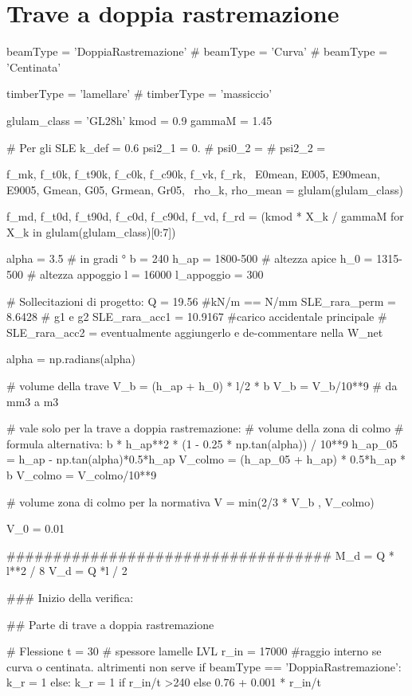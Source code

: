 \section{Trave a doppia rastremazione}
\begin{pycode}[TraveDoppiaRastremazione]
beamType = 'DoppiaRastremazione'
# beamType = 'Curva'
# beamType = 'Centinata'

timberType = 'lamellare'
# timberType = 'massiccio'

glulam_class = 'GL28h'
kmod = 0.9
gammaM = 1.45

# Per gli SLE
k_def = 0.6
psi2_1 = 0.
# psi0_2 =
# psi2_2 =

f_mk, f_t0k, f_t90k, f_c0k, f_c90k, f_vk, f_rk, \
E0mean, E005, E90mean, E9005, Gmean, G05, Grmean, Gr05, \
rho_k, rho_mean = glulam(glulam_class)

f_md, f_t0d, f_t90d, f_c0d, f_c90d, f_vd, f_rd = (kmod * X_k / gammaM for X_k in glulam(glulam_class)[0:7])

alpha = 3.5 # in gradi °
b = 240
h_ap = 1800-500 # altezza apice
h_0 = 1315-500 # altezza appoggio
l = 16000 
l_appoggio = 300

# Sollecitazioni di progetto:
Q = 19.56 #kN/m == N/mm
SLE_rara_perm = 8.6428 # g1 e g2
SLE_rara_acc1 = 10.9167 #carico accidentale principale
# SLE_rara_acc2 =  eventualmente aggiungerlo e de-commentare nella W_net

alpha = np.radians(alpha)

# volume della trave 
V_b = (h_ap + h_0) * l/2 * b 
V_b = V_b/10**9 # da mm3 a m3

# vale solo per la trave a doppia rastremazione:
# volume della zona di colmo
# formula alternativa: b * h_ap**2 * (1 - 0.25 * np.tan(alpha)) / 10**9
h_ap_05 = h_ap - np.tan(alpha)*0.5*h_ap
V_colmo =  (h_ap_05 + h_ap) * 0.5*h_ap * b
V_colmo = V_colmo/10**9

# volume zona di colmo per la normativa
V = min(2/3 * V_b , V_colmo)

V_0 = 0.01


###################################
M_d = Q * l**2 / 8
V_d = Q *l / 2

### Inizio della verifica:

## Parte di trave a doppia rastremazione

# Flessione
t = 30 # spessore lamelle LVL
r_in = 17000 #raggio interno se curva o centinata. altrimenti non serve
if beamType == 'DoppiaRastremazione':
    k_r = 1
else:
    k_r = 1 if r_in/t >240 else 0.76 + 0.001 * r_in/t


\end{pycode}
